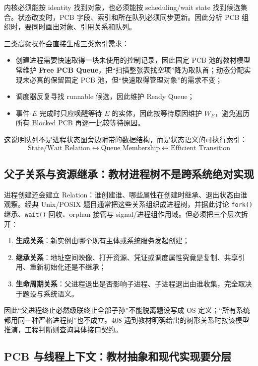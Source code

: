 \documentclass[11pt,a4paper]{ctexart}
\newcommand{\kw}[1]{\textbf{#1}}
\newcommand{\code}[1]{\texttt{#1}}
\begin{document}
内核必须能按 identity 找到对象，也必须能按 scheduling/wait state 找到候选集合。状态改变时，PCB 字段、索引和所在队列必须同步更新。因此分析 PCB 组织时，要同时画出对象、引用关系和队列。

\begin{method}
三类高频操作会直接生成三类索引需求：
\begin{itemize}
\item 创建进程需要快速取得一块未使用的控制记录，因此固定 PCB 池的教材模型常维护 \kw{Free PCB Queue}，把“扫描整张表找空项”降为取队首；动态分配实现未必真的保留固定 PCB 池，但“快速取得管理对象”的需求不变；
\item 调度器反复寻找 runnable 候选，因此维护 Ready Queue；
\item 事件 $E$ 完成时只应唤醒等待 $E$ 的实体，因此按等待原因维护 $W_E$，避免遍历所有 Blocked PCB 再逐一比较等待原因。
\end{itemize}
这说明队列不是进程状态图旁边附带的数据结构，而是状态语义的可执行索引：
\[
\boxed{\text{State/Wait Relation}\longleftrightarrow\text{Queue Membership}\longleftrightarrow\text{Efficient Transition}}
\]
\end{method}

\subsection{父子关系与资源继承：教材进程树不是跨系统绝对实现}

进程创建还会建立 Relation：谁创建谁、哪些属性在创建时继承、退出状态由谁观察。经典 Unix/POSIX 题目通常把这些关系组织成进程树，并据此讨论 \code{fork()} 继承、\code{wait()} 回收、orphan 接管与 signal/进程组作用域。但必须把三个层次拆开：
\begin{enumerate}
\item \kw{生成关系}：新实例由哪个现有主体或系统服务发起创建；
\item \kw{继承关系}：地址空间映像、打开资源、凭证或调度属性究竟是复制、共享引用、重新初始化还是不继承；
\item \kw{生命周期关系}：父进程退出是否影响子进程、子进程退出由谁收集，完全取决于题设与系统语义。
\end{enumerate}
因此“父进程终止必然级联终止全部子孙”不能脱离题设写成 OS 定义；“所有系统都用同一种严格进程树”也不成立。408 遇到教材明确给出的树形关系时按该模型推演，工程判断则查询具体接口契约。

\subsection{PCB 与线程上下文：教材抽象和现代实现要分层}
\end{document}
